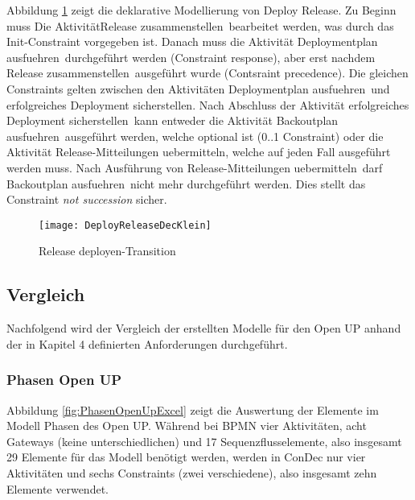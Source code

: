 Abbildung \ref{fig:DeployReleaseDecKlein} zeigt die deklarative Modellierung von \grqq Deploy Release\grqq.\newline
Zu Beginn muss Die Aktivität\grqq Release zusammenstellen\grqq \ bearbeitet werden, was durch das Init-Constraint vorgegeben ist. Danach muss die Aktivität \grqq Deploymentplan ausfuehren\grqq \ durchgeführt werden (Constraint response), aber erst nachdem \grqq Release zusammenstellen\grqq \ ausgeführt wurde (Contsraint precedence).\newline
Die gleichen Constraints gelten zwischen den Aktivitäten \grqq Deploymentplan ausfuehren\grqq \ und \grqq erfolgreiches Deployment sicherstellen\grqq.\newline
Nach Abschluss der Aktivität \grqq erfolgreiches Deployment sicherstellen\grqq \ kann entweder die Aktivität \grqq Backoutplan ausfuehren\grqq \ ausgeführt werden, welche optional ist (0..1 Constraint) oder die Aktivität \grqq Release-Mitteilungen uebermitteln\grqq, welche auf jeden Fall ausgeführt werden muss.\newline 
Nach Ausführung von \grqq Release-Mitteilungen uebermitteln\grqq \ darf \grqq Backoutplan ausfuehren\grqq \ nicht mehr durchgeführt werden. Dies stellt das Constraint \textit{not succession} sicher.
\begin{figure}[htp]
\begin{center}
  \texttt{[image: DeployReleaseDecKlein]} %
  \caption{Release deployen-Transition}
  \label{fig:DeployReleaseDecKlein}
\end{center}
\end{figure}

\clearpage

\subsection{Vergleich}

Nachfolgend wird der Vergleich der erstellten Modelle für den Open UP anhand der in Kapitel 4 definierten Anforderungen durchgeführt.

\subsubsection {Phasen Open UP}


Abbildung \ref{fig:PhasenOpenUpExcel} zeigt die Auswertung der Elemente im Modell \grqq Phasen des Open UP\grqq. Während bei BPMN vier Aktivitäten, acht Gateways (keine unterschiedlichen) und 17 Sequenzflusselemente, also insgesamt 29 Elemente für das Modell benötigt werden, werden in ConDec nur vier Aktivitäten und sechs Constraints (zwei verschiedene), also insgesamt zehn Elemente verwendet.

